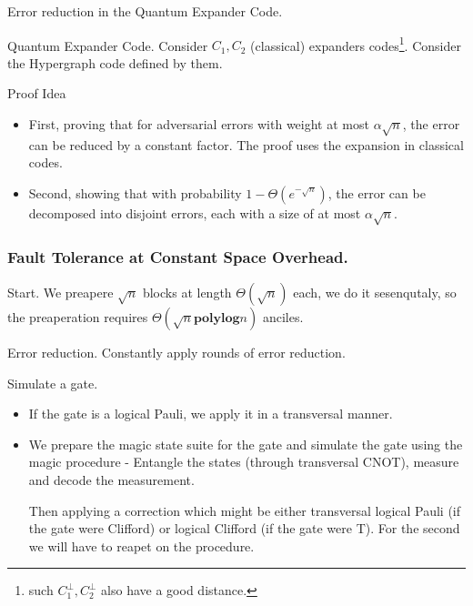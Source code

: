 \documentclass{beamer}
\begin{document}
\begin{frame}{Error reduction in the Quantum Expander Code.}
  \begin{block}{Quantum Expander Code.}
    Consider $C_{1},C_{2}$ (classical) expanders codes\footnote{such $C_{1}^{\perp}, C_{2}^{\perp}$ also have a good distance.}. Consider the Hypergraph code defined by them.
  \end{block}


  \begin{block}{Proof Idea}
    \begin{itemize}
      \item First, proving that for adversarial errors with weight at most $\alpha \sqrt{n}$, the error can be reduced by a constant factor. The proof uses the expansion in classical codes.
      \item Second, showing that with probability $1 - \Theta(e^{-\sqrt{n}})$, the error can be decomposed into disjoint errors, each with a size of at most $\alpha \sqrt{n}$.
    \end{itemize}
\end{block}
\end{frame}


\begin{frame}
  \frametitle{Fault Tolerance at Constant Space Overhead.}

  \begin{block}{Start.}
    We preapere $\sqrt{n}$ blocks at length $\Theta(\sqrt{n})$ each, we do it sesenqutaly, so the preaperation requires $\Theta(\sqrt{n} \mathbf{ poly log} n)$ anciles. 
  \end{block}
 
  \begin{block}{Error reduction.}
Constantly apply rounds of error reduction.
  \end{block}
  \begin{block}{Simulate a gate.}
    \begin{itemize}
      \item  If the gate is a logical Pauli, we apply it in a transversal manner.
      \item We prepare the magic state suite for the gate and simulate the gate using the magic procedure - Entangle the states (through transversal CNOT), measure and decode the measurement. 

        Then applying a correction which might be either transversal logical Pauli (if the gate were Clifford) or logical Clifford (if the gate were T). For the second we will have to reapet on the procedure. 
    \end{itemize}
  \end{block}


\end{frame}
\end{document}
